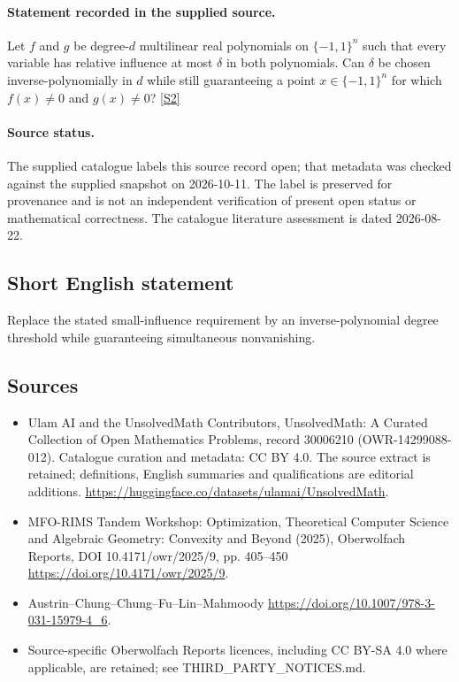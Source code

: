 \documentclass[11pt]{article}
\begin{document}
\paragraph{Statement recorded in the supplied source.}
Let $f$ and $g$ be degree-$d$ multilinear real polynomials on $\{-1,1\}^n$ such that every variable has relative influence at most $\delta$ in both polynomials. Can $\delta$ be chosen inverse-polynomially in $d$ while still guaranteeing a point $x\in\{-1,1\}^n$ for which $f(x)\neq0$ and $g(x)\neq0$? \href{https://doi.org/10.4171/owr/2025/9}{[S2]}
\paragraph{Source status.}
The supplied catalogue labels this source record open; that metadata was checked against the supplied snapshot on 2026-10-11. The label is preserved for provenance and is not an independent verification of present open status or mathematical correctness. The catalogue literature assessment is dated 2026-08-22.
\subsection{Short English statement}
Replace the stated small-influence requirement by an inverse-polynomial degree threshold while guaranteeing simultaneous nonvanishing.
\subsection{Sources}
\begin{itemize}
\item[S1] Ulam AI and the UnsolvedMath Contributors, UnsolvedMath: A Curated Collection of Open Mathematics Problems, record 30006210 (OWR-14299088-012). Catalogue curation and metadata: CC BY 4.0. The source extract is retained; definitions, English summaries and qualifications are editorial additions.
\url{https://huggingface.co/datasets/ulamai/UnsolvedMath}.
\item[S2] MFO-RIMS Tandem Workshop: Optimization, Theoretical Computer Science and Algebraic Geometry: Convexity and Beyond (2025), Oberwolfach Reports, DOI 10.4171/owr/2025/9, pp. 405--450
\url{https://doi.org/10.4171/owr/2025/9}.
\item[S3] Austrin--Chung--Chung--Fu--Lin--Mahmoody
\url{https://doi.org/10.1007/978-3-031-15979-4_6}.
\item Source-specific Oberwolfach Reports licences, including CC BY-SA 4.0 where applicable, are retained; see THIRD\_PARTY\_NOTICES.md.
\end{itemize}
\end{document}
